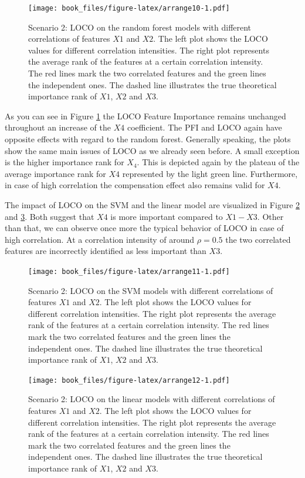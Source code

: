 \documentclass[
]{krantz}
\begin{document}
\begin{figure}
\centering
\texttt{[image: book\_files/figure-latex/arrange10-1.pdf]}
\caption{\label{fig:arrange10}Scenario 2: LOCO on the random forest models with different correlations of features \(X1\) and \(X2\). The left plot shows the LOCO values for different correlation intensities. The right plot represents the average rank of the features at a certain correlation intensity. The red lines mark the two correlated features and the green lines the independent ones. The dashed line illustrates the true theoretical importance rank of \(X1\), \(X2\) and \(X3\).}
\end{figure}

As you can see in Figure \ref{fig:arrange10} the LOCO Feature Importance remains unchanged throughout an increase of the \(X4\) coefficient. The PFI and LOCO again have opposite effects with regard to the random forest. Generally speaking, the plots show the same main issues of LOCO as we already seen before. A small exception is the higher importance rank for \(X_4\). This is depicted again by the plateau of the average importance rank for \(X4\) represented by the light green line. Furthermore, in case of high correlation the compensation effect also remains valid for \(X4\).

The impact of LOCO on the SVM and the linear model are visualized in Figure \ref{fig:arrange11} and \ref{fig:arrange12}. Both suggest that \(X4\) is more important compared to \(X1 - X3\). Other than that, we can observe once more the typical behavior of LOCO in case of high correlation. At a correlation intensity of around \(\rho=0.5\) the two correlated features are incorrectly identified as less important than \(X3\).

\begin{figure}
\centering
\texttt{[image: book\_files/figure-latex/arrange11-1.pdf]}
\caption{\label{fig:arrange11}Scenario 2: LOCO on the SVM models with different correlations of features \(X1\) and \(X2\). The left plot shows the LOCO values for different correlation intensities. The right plot represents the average rank of the features at a certain correlation intensity. The red lines mark the two correlated features and the green lines the independent ones. The dashed line illustrates the true theoretical importance rank of \(X1\), \(X2\) and \(X3\).}
\end{figure}

\begin{figure}
\centering
\texttt{[image: book\_files/figure-latex/arrange12-1.pdf]}
\caption{\label{fig:arrange12}Scenario 2: LOCO on the linear models with different correlations of features \(X1\) and \(X2\). The left plot shows the LOCO values for different correlation intensities. The right plot represents the average rank of the features at a certain correlation intensity. The red lines mark the two correlated features and the green lines the independent ones. The dashed line illustrates the true theoretical importance rank of \(X1\), \(X2\) and \(X3\).}
\end{figure}
\end{document}
